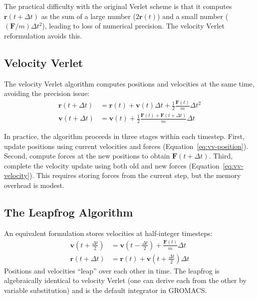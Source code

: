 The practical difficulty with the original Verlet scheme is that it computes $\mathbf{r}(t+\Delta t)$ as the sum of a large number ($2\mathbf{r}(t)$) and a small number ($(\mathbf{F}/m)\Delta t^2$), leading to loss of numerical precision. The velocity Verlet reformulation avoids this.

\subsection{Velocity Verlet}
\label{sec:velocity-verlet}

The velocity Verlet algorithm computes positions and velocities at the same time, avoiding the precision issue:
\begin{align}
\label{eq:vv-position}
\mathbf{r}(t + \Delta t) &= \mathbf{r}(t) + \mathbf{v}(t)\Delta t + \frac{1}{2}\frac{\mathbf{F}(t)}{m}\Delta t^2 \\[4pt]
\label{eq:vv-velocity}
\mathbf{v}(t + \Delta t) &= \mathbf{v}(t) + \frac{1}{2}\frac{\mathbf{F}(t) + \mathbf{F}(t+\Delta t)}{m}\Delta t
\end{align}

In practice, the algorithm proceeds in three stages within each timestep. First, update positions using current velocities and forces (Equation~\ref{eq:vv-position}). Second, compute forces at the new positions to obtain $\mathbf{F}(t+\Delta t)$. Third, complete the velocity update using both old and new forces (Equation~\ref{eq:vv-velocity}). This requires storing forces from the current step, but the memory overhead is modest.

\subsection{The Leapfrog Algorithm}
\label{sec:leapfrog}

An equivalent formulation stores velocities at half-integer timesteps:
\begin{align}
\label{eq:leapfrog-v}
\mathbf{v}\!\left(t + \tfrac{\Delta t}{2}\right) &= \mathbf{v}\!\left(t - \tfrac{\Delta t}{2}\right) + \frac{\mathbf{F}(t)}{m}\Delta t \\[4pt]
\label{eq:leapfrog-r}
\mathbf{r}(t + \Delta t) &= \mathbf{r}(t) + \mathbf{v}\!\left(t + \tfrac{\Delta t}{2}\right)\Delta t
\end{align}
Positions and velocities ``leap'' over each other in time. The leapfrog is algebraically identical to velocity Verlet (one can derive each from the other by variable substitution) and is the default integrator in GROMACS.

